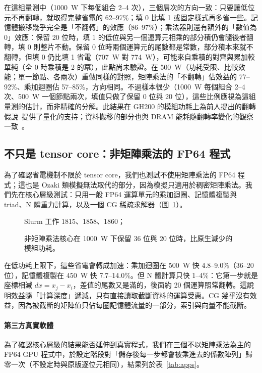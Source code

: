 在這組量測中（1000~W 下每個組合 2–4 次），三個層次的方向一致：只要讓低位元不再翻轉，就取得完整省電的 62–97\%；填 0 比填 1 或固定樣式再多省一些。記憶體搬移幾乎完全是「不翻轉」的效應（86–97\%）；乘法器則還有額外的「數值為 0」效應：保留 20 位時，填 1 的低位與另一個運算元相乘的部分積仍會隨後者翻轉，填 0 則整片不動。保留 0 位時兩個運算元的尾數都是常數，部分積本來就不翻轉，但填 0 仍比填 1 省電（707~W 對 774~W），可能來自乘積的對齊與累加較單純（全 0 時乘積是 2 的冪），此點尚未驗證。在 500~W（功耗受限、比較效能；單一節點、各兩次）重做同樣的對照，矩陣乘法的「不翻轉」佔效益的 77–92\%、乘加迴圈佔 57–85\%，方向相同。不過樣本很少（1000~W 每個組合 2–4 次、500~W 一個節點兩次，填值只做了保留 0 位與 20 位），這些比例應視為這組量測的估計，而非精確的分解。此結果在 GH200 的模組功耗上為前人提出的翻轉假說~\cite{Gregersen2024}提供了量化的支持；資料搬移的部分也與 DRAM 能耗隨翻轉率變化的觀察一致~\cite{Chatterjee2017,Ghose2018}。

\subsection{不只是 tensor core：非矩陣乘法的 FP64 程式}\label{sec:nongemm}

為了確認省電機制不限於 tensor core，我們也測試不使用矩陣乘法的 FP64 程式；這也是 Ozaki 類模擬無法取代的部分，因為模擬只適用於稠密矩陣乘法。我們先在核心層級測試：只用一般 FP64 運算單元的乘加迴圈、記憶體複製與 triad、N 體重力計算，以及一個 CG 稀疏求解器（圖~\ref{fig:nongemm}）。

\begin{figure}[tbp]
\centering
{}
\caption[非矩陣乘法核心在 1000~W 下的省電]{非矩陣乘法核心在 1000~W 下保留 36 位與 20 位時，比原生減少的模組功耗。}\label{fig:nongemm}
\begin{figsource}Slurm 工作 1815、1858、1860；\end{figsource}
\end{figure}

在低功耗上限下，這些省電會轉成加速：乘加迴圈在 500~W 快 4.8–9.0\%（36–20 位），記憶體複製在 450~W 快 7.7–14.0\%。但 N 體計算只快 1–4\%：它第一步就是座標相減 $\mathit{dx} = x_j - x_i$，差值的尾數又是滿的，後面約 20 個運算照常翻轉。這說明效益隨「計算深度」遞減，只有直接讀取截斷資料的運算受惠。CG 幾乎沒有效益，因為被截斷的矩陣值只佔每圈記憶體流量的一部分，索引與向量不能截斷。

\paragraph{第三方真實軟體}為了確認核心層級的結果能否延伸到真實程式，我們在三個不以矩陣乘法為主的 FP64 GPU 程式中，於設定階段對「儲存後每一步都會被乘進去的係數陣列」歸零一次（不設定時與原版逐位元相同），結果列於表~\ref{tab:apps}。

